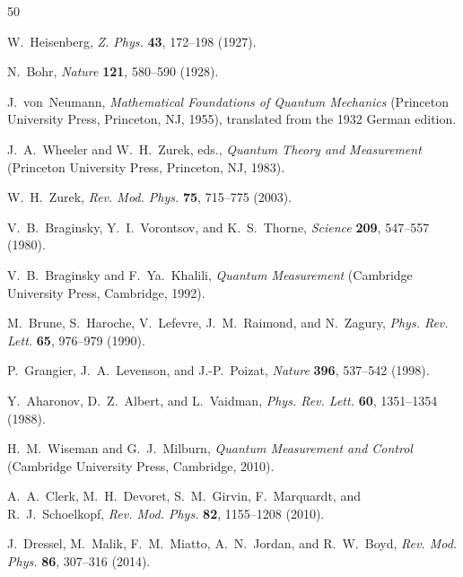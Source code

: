 \documentclass[twocolumn,10pt]{article}
\begin{document}
\begin{thebibliography}{50}


W.~Heisenberg,
\textit{Z. Phys.} \textbf{43}, 172--198 (1927).

N.~Bohr,
\textit{Nature} \textbf{121}, 580--590 (1928).

J.~von~Neumann,
\textit{Mathematical Foundations of Quantum Mechanics}
(Princeton University Press, Princeton, NJ, 1955),
translated from the 1932 German edition.


J.~A.~Wheeler and W.~H.~Zurek, eds.,
\textit{Quantum Theory and Measurement}
(Princeton University Press, Princeton, NJ, 1983).

W.~H.~Zurek,
\textit{Rev. Mod. Phys.} \textbf{75}, 715--775 (2003).

V.~B.~Braginsky, Y.~I.~Vorontsov, and K.~S.~Thorne,
\textit{Science} \textbf{209}, 547--557 (1980).

V.~B.~Braginsky and F.~Ya.~Khalili,
\textit{Quantum Measurement}
(Cambridge University Press, Cambridge, 1992).

M.~Brune, S.~Haroche, V.~Lefevre, J.~M.~Raimond, and N.~Zagury,
\textit{Phys. Rev. Lett.} \textbf{65}, 976--979 (1990).

P.~Grangier, J.~A.~Levenson, and J.-P.~Poizat,
\textit{Nature} \textbf{396}, 537--542 (1998).

Y.~Aharonov, D.~Z.~Albert, and L.~Vaidman,
\textit{Phys. Rev. Lett.} \textbf{60}, 1351--1354 (1988).

H.~M.~Wiseman and G.~J.~Milburn,
\textit{Quantum Measurement and Control}
(Cambridge University Press, Cambridge, 2010).

A.~A.~Clerk, M.~H.~Devoret, S.~M.~Girvin, F.~Marquardt, and
R.~J.~Schoelkopf,
\textit{Rev. Mod. Phys.} \textbf{82}, 1155--1208 (2010).

J.~Dressel, M.~Malik, F.~M.~Miatto, A.~N.~Jordan, and R.~W.~Boyd,
\textit{Rev. Mod. Phys.} \textbf{86}, 307--316 (2014).


\end{thebibliography}
\end{document}
